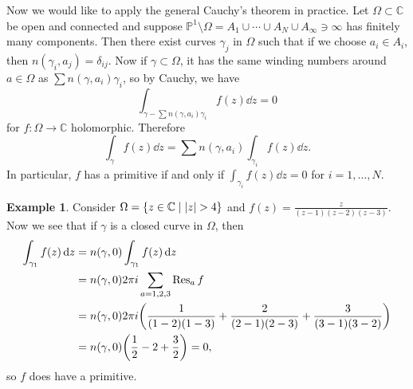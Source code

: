\documentclass[leqno, openany]{memoir}
\theoremstyle{definition}
\newtheorem{exm}[thm]{Example}
\theoremstyle{remark}
\theoremstyle{plain}
\theoremstyle{definition}
\theoremstyle{remark}
\newcommand{\C}{\mathbb{C}}
\renewcommand{\P}{\mathbb{P}}
\begin{document}
Now we would like to apply the general Cauchy's theorem in practice. Let $\Omega \subset \C$ be open and connected and suppose $\P^1 \setminus \Omega = A_1 \cup \cdots \cup A_N \cup A_{\infty} \ni \infty$ has finitely many components. Then there exist curves $\gamma_j$ in $\Omega$ such that if we choose $a_i \in A_i$, then $n(\gamma_i, a_j) = \delta_{ij}$. Now if $\gamma \subset \Omega$, it has the same winding numbers around $a \in \Omega$ as $\sum n(\gamma, a_i) \gamma_i$, so by Cauchy, we have
\[ \int_{\gamma - \sum n(\gamma, a_i) \gamma_i} f(z) \dd{z} = 0 \]
for $f \colon \Omega \to \C$ holomorphic. Therefore
\[ \int_{\gamma} f(z) \dd{z} = \sum n(\gamma, a_i) \int_{\gamma_i} f(z) \dd{z}. \]
In particular, $f$ has a primitive if and only if $\int_{\gamma_i} f(z) \dd{z} = 0$ for $i = 1, \ldots, N$.

\begin{exm}
    Consider $\Omega = \qty{z \in \C \mid \abs{z} > 4}$ and $f(z) = \frac{z}{(z-1)(z-2)(z-3)}$. Now we see that if $\gamma$ is a closed curve in $\Omega$, then
    \begin{align*}
        \int_{\gamma_1} f(z) \dd{z} &= n(\gamma, 0) \int_{\gamma_1} f(z) \dd{z} \\
                                    &= n(\gamma, 0) 2 \pi i \sum_{a=1,2,3} \Res_a f \\
                                    &= n(\gamma, 0) 2 \pi i \qty(\frac{1}{(1-2)(1-3)} + \frac{2}{(2-1)(2-3)} + \frac{3}{(3-1)(3-2)}) \\
                                    &= n(\gamma, 0) \qty(\frac{1}{2} - 2 + \frac{3}{2}) = 0,
    \end{align*}
    so $f$ does have a primitive.
\end{exm}
\end{document}
